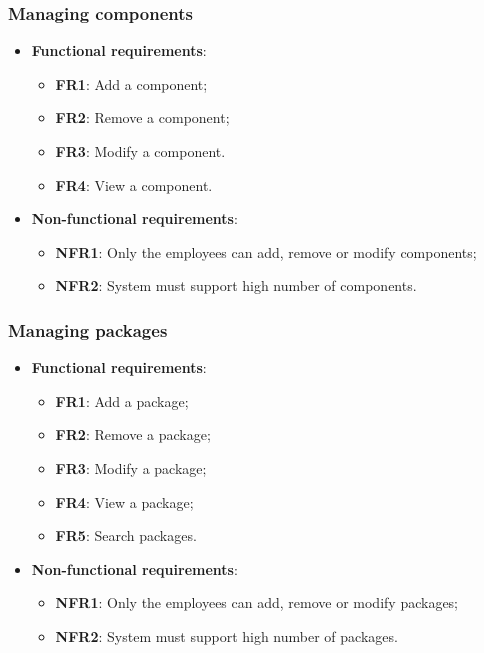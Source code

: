 \documentclass[a4paper,12pt]{book}
\begin{document}
\subsubsection{Managing components}
\begin{itemize}
  \item \textbf{Functional requirements}:
  \begin{itemize}[noitemsep]
    \item \textbf{FR1}: Add a component;
    \item \textbf{FR2}: Remove a component;
    \item \textbf{FR3}: Modify a component.
    \item \textbf{FR4}: View a component.
  \end{itemize}
  \item \textbf{Non-functional requirements}:
  \begin{itemize}[noitemsep]
    \item \textbf{NFR1}: Only the employees can add, remove or modify components;
    \item \textbf{NFR2}: System must support high number of components.
  \end{itemize}
\end{itemize}

\subsubsection{Managing packages}
\begin{itemize}
  \item \textbf{Functional requirements}:
  \begin{itemize}[noitemsep]
    \item \textbf{FR1}: Add a package;
    \item \textbf{FR2}: Remove a package;
    \item \textbf{FR3}: Modify a package;
    \item \textbf{FR4}: View a package;
    \item \textbf{FR5}: Search packages.
  \end{itemize}
  \item \textbf{Non-functional requirements}:
  \begin{itemize}[noitemsep]
    \item \textbf{NFR1}: Only the employees can add, remove or modify packages;
    \item \textbf{NFR2}: System must support high number of packages.
  \end{itemize}
\end{itemize}
\end{document}
